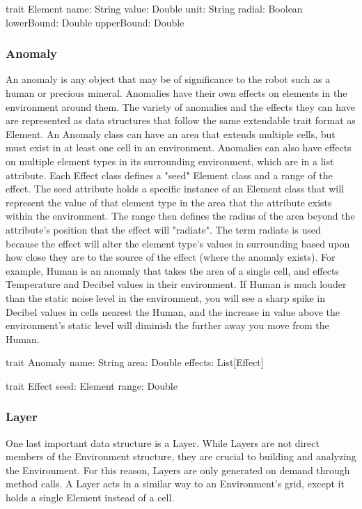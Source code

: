 trait Element {
  name: String
  value: Double
  unit: String
  radial: Boolean
  lowerBound: Double
  upperBound: Double
}

\subsubsection{Anomaly}
An anomaly is any object that may be of significance to the robot such as a human or precious mineral.
Anomalies have their own effects on elements in the environment around them.
The variety of anomalies and the effects they can have are represented as data structures that follow the same extendable trait format as Element.
An Anomaly class can have an area that extends multiple cells, but must exist in at least one cell in an environment.
Anomalies can also have effects on multiple element types in its surrounding environment, which are in a list attribute.
Each Effect class defines a "seed" Element class and a range of the effect.
The seed attribute holds a specific instance of an Element class that will represent the value of that element type in the area that the attribute exists within the environment.
The range then defines the radius of the area beyond the attribute's position that the effect will "radiate".
The term radiate is used because the effect will alter the element type's values in surrounding based upon how close they are to the source of the effect (where the anomaly exists).
For example, Human is an anomaly that takes the area of a single cell, and effects Temperature and Decibel values in their environment.
If Human is much louder than the static noise level in the environment, you will see a sharp spike in Decibel values in cells nearest the Human, and the increase in value above the environment's static level will diminish the further away you move from the Human.

trait Anomaly {
  name: String
  area: Double
  effects: List[Effect]
}

trait Effect {
  seed: Element
  range: Double
}

\subsubsection{Layer}
One last important data structure is a Layer.
While Layers are not direct members of the Environment structure, they are crucial to building and analyzing the Environment.
For this reason, Layers are only generated on demand through method calls.
A Layer acts in a similar way to an Environment’s grid, except it holds a single Element instead of a cell.


